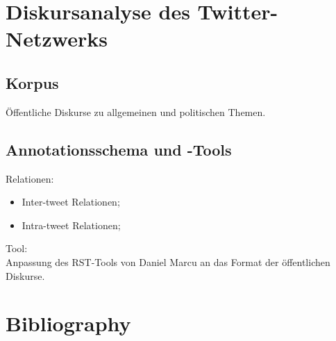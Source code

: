 \documentclass{beamer}
\begin{document}
    \section{Diskursanalyse des Twitter-Netzwerks}
    \subsection{Korpus}
    \begin{frame}{\insertsubsection}
      \"Offentliche Diskurse zu allgemeinen und politischen Themen.
    \end{frame}

    \subsection{Annotationsschema und -Tools}
    \begin{frame}{\insertsubsection}
      Relationen:
      \begin{itemize}
        \item Inter-tweet Relationen;
        \item Intra-tweet Relationen;
      \end{itemize}

      Tool:\\ Anpassung des RST-Tools von Daniel Marcu an das Format der
      \"offentlichen Diskurse.
    \end{frame}

    \section*{Bibliography}
    
    
    
\end{document}
